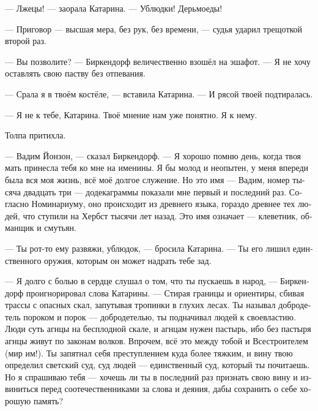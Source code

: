 \documentclass[a4paper,12pt,fleqn]{book}\usepackage{polyglossia}\setdefaultlanguage[babelshorthands=true]{russian}\setotherlanguage{english}\defaultfontfeatures{Ligatures=TeX,Mapping=tex-text}\usepackage{xcolor}\newcommand{\ml}[3]{#2}
\begin{document}
--- Лжецы! --- заорала Катарина.
--- Ублюдки!
Дерьмоеды!

--- Приговор --- высшая мера, без рук, без времени, --- судья ударил трещоткой второй раз.

--- Вы позволите? --- Биркендорф величественно взошёл на эшафот.
--- Я не хочу оставлять свою паству без отпевания.

--- Срала я в твоём костёле, --- вставила Катарина.
--- И рясой твоей подтиралась.

--- Я не к тебе, Катарина.
Твоё мнение нам уже понятно.
Я к нему.

Толпа притихла.

\ml{$0$}
{--- Вадим Йонзон, --- сказал Биркендорф.}
{``Wadim Jonson,'' Birkendorf said.}
--- Я хорошо помню день, когда твоя мать принесла тебя ко мне на именины.
Я бы молод и неопытен, у меня впереди была вся моя жизнь, всё моё долгое служение.
\ml{$0$}
{Но это имя --- Вадим, номер тысяча двадцать три --- додекаграммы показали мне первый и последний раз.}
{But this name, Wadim, number ten twenty three, dodekagrammas shown me first and last time.}
Согласно Номинариуму, оно происходит из древнего языка, гораздо древнее тех людей, что ступили на Хербст тысячи лет назад.
\ml{$0$}
{Это имя означает --- клеветник, обманщик и смутьян.}
{This name means a man of slander, deceit, and turmoil.''}

--- Ты рот-то ему развяжи, ублюдок, --- бросила Катарина.
\ml{$0$}
{--- Ты его лишил единственного оружия, которым он может надрать тебе зад.}
{``You've deprived him of the only weapon he can kick your arse with.''}

--- Я долго с болью в сердце слушал о том, что ты пускаешь в народ, --- Биркендорф проигнорировал слова Катарины.
--- Стирая границы и ориентиры, сбивая трассы с опасных скал, запутывая тропинки в глухих лесах.
Ты называл добродетель пороком и порок --- добродетелью, ты подначивал людей к своевластию.
\ml{$0$}
{Люди суть агнцы на бесплодной скале, и агнцам нужен пастырь, ибо без пастыря агнцы живут по законам волков.}
{Humans are but lambs on a barren rock, and lambs need the shepherd, for with no shepherd lambs live by the rule of wolves.}
Впрочем, всё это между тобой и Всестроителем (мир им!).
Ты запятнал себя преступлением куда более тяжким, и вину твою определил светский суд, суд людей --- единственный суд, который ты почитаешь.
Но я спрашиваю тебя --- хочешь ли ты в последний раз признать свою вину и извиниться перед соотечественниками за слова и деяния, дабы сохранить о себе хорошую память?
\end{document}
